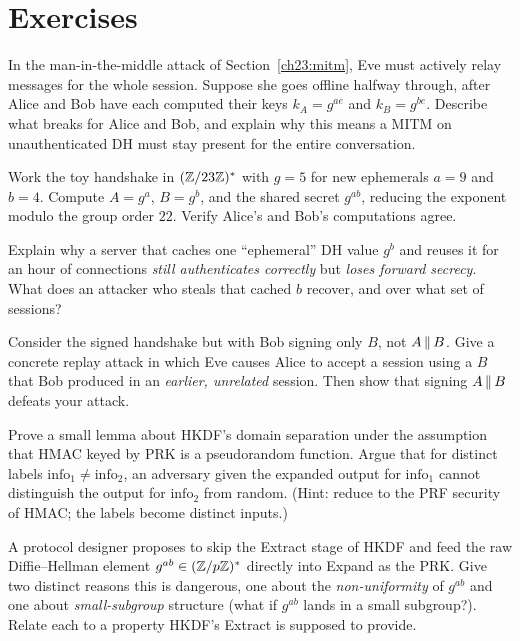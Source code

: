 \section{Exercises}

\begin{exercise}
In the man-in-the-middle attack of Section~\ref{ch23:mitm}, Eve must actively relay
messages for the whole session. Suppose she goes offline halfway through, after
Alice and Bob have each computed their keys $k_A=g^{ae}$ and $k_B=g^{be}$.
Describe what breaks for Alice and Bob, and explain why this means a MITM
on unauthenticated DH must stay present for the entire conversation.
\end{exercise}

\begin{exercise}
Work the toy handshake in $(\mathbb{Z}/23\mathbb{Z})^{*}$ with $g=5$ for new ephemerals $a=9$ and
$b=4$. Compute $A=g^a$, $B=g^b$, and the shared secret $g^{ab}$, reducing the
exponent modulo the group order $22$. Verify Alice's and Bob's computations
agree.
\end{exercise}

\begin{exercise}
Explain why a server that caches one ``ephemeral'' DH value $g^b$ and
reuses it for an hour of connections \emph{still authenticates correctly} but
\emph{loses forward secrecy}. What does an attacker who steals that cached $b$
recover, and over what set of sessions?
\end{exercise}

\begin{exercise}
Consider the signed handshake but with Bob signing only $B$, not $A\,\|\, B$.
Give a concrete replay attack in which Eve causes Alice to accept a session using
a $B$ that Bob produced in an \emph{earlier, unrelated} session. Then show that
signing $A\,\|\, B$ defeats your attack.
\end{exercise}

\begin{exercise}
Prove a small lemma about HKDF's domain separation under the assumption that
HMAC keyed by $\mathrm{PRK}$ is a pseudorandom function. Argue that for distinct
labels $\mathrm{info}_1\neq\mathrm{info}_2$, an adversary given the expanded
output for $\mathrm{info}_1$ cannot distinguish the output for $\mathrm{info}_2$
from random. (Hint: reduce to the PRF security of HMAC; the labels become
distinct inputs.)
\end{exercise}

\begin{exercise}
A protocol designer proposes to skip the Extract stage of HKDF and feed the raw
Diffie--Hellman element $g^{ab}\in(\mathbb{Z}/p\mathbb{Z})^{*}$ directly into Expand as the
$\mathrm{PRK}$. Give two distinct reasons this is dangerous, one about the
\emph{non-uniformity} of $g^{ab}$ and one about \emph{small-subgroup} structure
(what if $g^{ab}$ lands in a small subgroup?). Relate each to a property HKDF's
Extract is supposed to provide.
\end{exercise}


